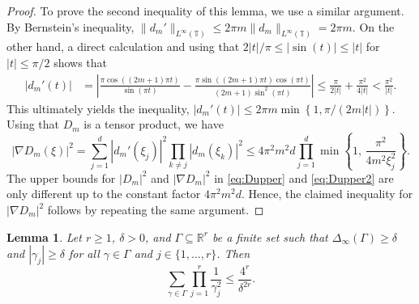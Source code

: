 \documentclass[11pt]{article}
\newtheorem{lemma}[theorem]{Lemma}
\theoremstyle{definition}
\numberwithin{theorem}{section}
\numberwithin{lemma}{section}
\numberwithin{equation}{section}
\def\R{\mathbb{R}}
\def\T{\mathbb{T}}
\renewcommand{\subset}{\subseteq}
\numberwithin{equation}{section}
\begin{document}
\begin{proof}
		To prove the second inequality of this lemma, we use a similar argument. By Bernstein's inequality, 
		$\|d_m'\|_{L^\infty(\T)}\leq 2\pi m\|d_m\|_{L^\infty(\T)}=2\pi m.
		$
		On the other hand, a direct calculation and using that $2|t|/\pi \leq |\sin(t)|\leq |t|$ for $|t|\leq \pi/2$ shows that
		\begin{align*}
			|d_m'(t)|
			&=\left| \frac{ \pi \cos((2m+1)\pi t)}{\sin(\pi t)} - \frac{ \pi \sin((2m+1)\pi t)\cos(\pi t)}{(2m+1)\sin^2(\pi t)}\right| 
			\leq \frac{\pi}{2|t|}+\frac{\pi^2}{4|t|}
			< \frac{\pi^2}{|t|}. 
		\end{align*}
		This ultimately yields the inequality, $|d_m'(t)|
			\leq 2 \pi m \min\left\{1, {\pi}/(2m|t|) \right\}$. 
		Using that $D_m$ is a tensor product, we have 
		\begin{equation}
			\label{eq:Dupper2}
			|\nabla D_m(\xi)|^2
			=\sum_{j=1}^d |d_m'(\xi_j)|^2 \prod_{k\ne j} |d_m(\xi_k)|^2
			\leq 4 \pi^2 m^2 d \prod_{j=1}^d \min \left\{1, \, \frac{\pi^2}{4m^2 \xi_j^2} \right\}.
		\end{equation}
		The upper bounds for $|D_m|^2$ and $|\nabla D_m|^2$ in \eqref{eq:Dupper} and \eqref{eq:Dupper2} are only different up to the constant factor $4\pi^2 m^2 d $. Hence, the claimed inequality for $|\nabla D_m|^2$ follows by repeating the same argument.
	\end{proof}
	
	\begin{lemma}
		\label{lem:boxpacking}
		Let $r\geq 1$, $\delta>0$, and $\Gamma\subset\R^r$ be a finite set such that $\Delta_\infty(\Gamma)\geq \delta$ and $|\gamma_j|\geq \delta$ for all $\gamma\in \Gamma$ and $j\in \{1,\dots,r\}$. Then 
		$$
		\sum_{\gamma\in \Gamma} \prod_{j=1}^r \frac{1}{\gamma_j^2} 
		\leq \frac{4^r}{\delta^{2r}}. 
		$$
	\end{lemma}
	
\end{document}
